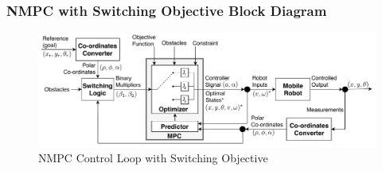	\begin{frame}
		\frametitle{NMPC with Switching Objective Block Diagram}
		\begin{figure}[hbtp]
			\centering
			\includegraphics[scale=0.65]{pictures/block_diagram_polar_switch_1.pdf}
			\caption{NMPC Control Loop with Switching Objective}
		\end{figure}
	\end{frame}


